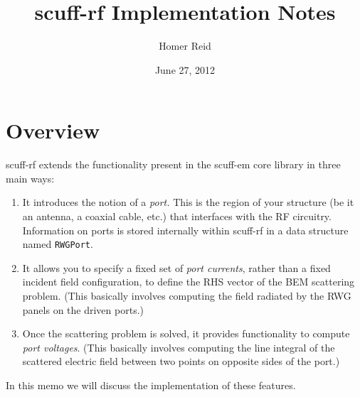 \documentclass[letterpaper]{article}
\title {{\sc scuff-rf} Implementation Notes}
\author {Homer Reid}
\date {June 27, 2012}
\begin{document}
\pagestyle{myheadings}
\maketitle

\tableofcontents

\section{Overview}

{\sc scuff-rf} extends the functionality present in the
{\sc scuff-em} core library in three main ways:

\begin{enumerate}
  \item It introduces the notion of a \textit{port.} This is the region
        of your structure (be it an antenna, a coaxial cable, etc.)
        that interfaces with the RF circuitry. Information on ports 
        is stored internally within {\sc scuff-rf} in a data structure
        named \texttt{RWGPort}.
  \item It allows you to specify a fixed set of \textit{port currents}, 
        rather than a fixed incident field configuration, to define the
        RHS vector of the BEM scattering problem. (This basically
        involves computing the field radiated by the RWG panels on
        the driven ports.)
  \item Once the scattering problem is solved, it provides functionality
        to compute \textit{port voltages}. (This basically involves 
        computing the line integral of the scattered electric field 
        between two points on opposite sides of the port.)
\end{enumerate}

In this memo we will discuss the implementation of these features.

\newpage
\end{document}
